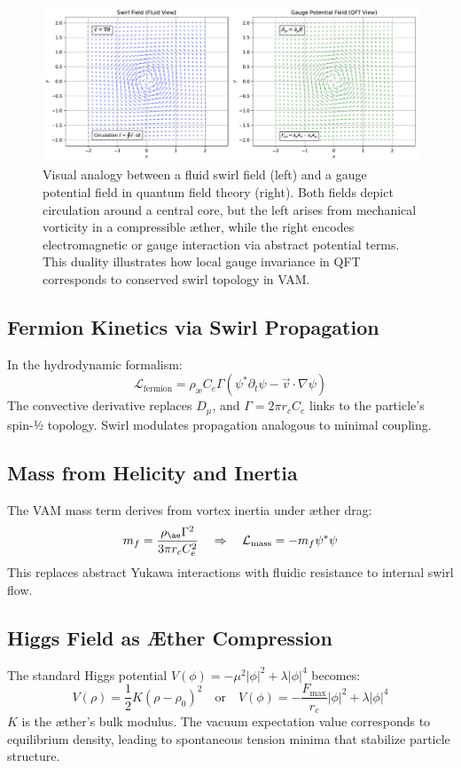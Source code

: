 \begin{figure}[H]
    \centering
    \includegraphics[width=0.9\linewidth]{SwirlVSGauge}
    \caption{
        Visual analogy between a fluid swirl field (left) and a gauge potential field in quantum field theory (right).
        Both fields depict circulation around a central core, but the left arises from mechanical vorticity in a compressible æther,
        while the right encodes electromagnetic or gauge interaction via abstract potential terms.
        This duality illustrates how local gauge invariance in QFT corresponds to conserved swirl topology in VAM.
    }
    \label{fig:swirl_gauge_analogy}
\end{figure}

\subsection{Fermion Kinetics via Swirl Propagation}
In the hydrodynamic formalism:
\begin{equation}
    \mathcal{L}_{\text{fermion}} = \rho_\text{\ae} C_e \Gamma \left( \psi^* \partial_t \psi - \vec{v} \cdot \nabla \psi \right)
\end{equation}
The convective derivative replaces $D_\mu$, and $\Gamma = 2\pi r_c C_e$ links to the particle’s spin-½ topology. Swirl modulates propagation analogous to minimal coupling.

\subsection{Mass from Helicity and Inertia}
The VAM mass term derives from vortex inertia under æther drag:
\begin{equation}
    m_f = \frac{\rho_{\ae} \Gamma^2}{3\pi r_c C_e^2} \quad\Rightarrow\quad \mathcal{L}_{\text{mass}} = -m_f \psi^* \psi
\end{equation}
This replaces abstract Yukawa interactions with fluidic resistance to internal swirl flow.

\subsection{Higgs Field as Æther Compression}
The standard Higgs potential $V(\phi) = -\mu^2|\phi|^2 + \lambda|\phi|^4$ becomes:
\begin{equation}
    V(\rho) = \frac{1}{2}K(\rho - \rho_0)^2 \quad\text{or}\quad V(\phi) = -\frac{F_\text{max}}{r_c} |\phi|^2 + \lambda |\phi|^4
\end{equation}
$K$ is the æther’s bulk modulus. The vacuum expectation value corresponds to equilibrium density, leading to spontaneous tension minima that stabilize particle structure.


